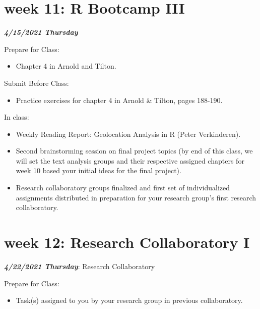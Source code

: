 \documentclass[
]{book}
\providecommand{\tightlist}{%
  \setlength{\itemsep}{0pt}\setlength{\parskip}{0pt}}
\begin{document}
\hypertarget{week-11-r-bootcamp-iii-1}{%
\chapter{week 11: R Bootcamp III}\label{week-11-r-bootcamp-iii-1}}

\textbf{\emph{4/15/2021 Thursday}}

Prepare for Class:

\begin{itemize}
\tightlist
\item
  Chapter 4 in Arnold and Tilton.
\end{itemize}

Submit Before Class:

\begin{itemize}
\tightlist
\item
  Practice exercises for chapter 4 in Arnold \& Tilton, pages 188-190.
\end{itemize}

In class:

\begin{itemize}
\tightlist
\item
  Weekly Reading Report: Geolocation Analysis in R (Peter Verkinderen).
\item
  Second brainstorming session on final project topics (by end of this class, we will set the text analysis groups and their respective assigned chapters for week 10 based your initial ideas for the final project).
\item
  Research collaboratory groups finalized and first set of individualized assignments distributed in preparation for your research group's first research collaboratory.
\end{itemize}

\hypertarget{week-12-research-collaboratory-i-1}{%
\chapter{week 12: Research Collaboratory I}\label{week-12-research-collaboratory-i-1}}

\textbf{\emph{4/22/2021 Thursday}}: Research Collaboratory

Prepare for Class:

\begin{itemize}
\tightlist
\item
  Task(s) assigned to you by your research group in previous collaboratory.
\end{itemize}
\end{document}
